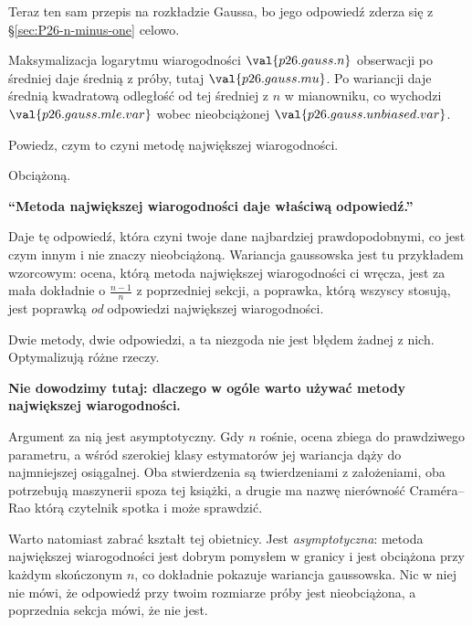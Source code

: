 \begin{fr}
Teraz ten sam przepis na rozkładzie Gaussa, bo jego odpowiedź zderza się z
\S\ref{sec:P26-n-minus-one} celowo.

Maksymalizacja logarytmu wiarogodności $\val{p26.gauss.n}$ obserwacji po
średniej daje średnią z próby, tutaj $\val{p26.gauss.mu}$. Po wariancji daje
średnią kwadratową odległość od tej średniej \dash{} z $n$ w mianowniku, co
wychodzi $\val{p26.gauss.mle.var}$ wobec nieobciążonej
$\val{p26.gauss.unbiased.var}$.

Powiedz, czym to czyni metodę największej wiarogodności.
\dotline
\nextframe
\end{fr}

\begin{fr}
\begin{ansblock}
Obciążoną.
\end{ansblock}

\begin{trapbox}
\textbf{\enquote{Metoda największej wiarogodności daje właściwą odpowiedź.}}

Daje tę odpowiedź, która czyni twoje dane najbardziej prawdopodobnymi, co
jest czym innym i nie znaczy nieobciążoną. Wariancja gaussowska jest tu
przykładem wzorcowym: ocena, którą metoda największej wiarogodności ci wręcza,
jest za mała dokładnie o $\frac{n-1}{n}$ z poprzedniej sekcji, a poprawka,
którą wszyscy stosują, jest poprawką \emph{od} odpowiedzi największej
wiarogodności.

Dwie metody, dwie odpowiedzi, a ta niezgoda nie jest błędem żadnej z nich.
Optymalizują różne rzeczy.
\end{trapbox}
\end{fr}

\begin{fr}
\begin{rigourbox}
\textbf{Nie dowodzimy tutaj: dlaczego w ogóle warto używać metody największej
wiarogodności.}

Argument za nią jest asymptotyczny. Gdy $n$ rośnie, ocena zbiega do
prawdziwego parametru, a wśród szerokiej klasy estymatorów jej wariancja
dąży do najmniejszej osiągalnej. Oba stwierdzenia są twierdzeniami z
założeniami, oba potrzebują maszynerii spoza tej książki, a drugie ma nazwę
\dash{} nierówność Craméra--Rao \dash{} którą czytelnik spotka i może
sprawdzić.

Warto natomiast zabrać kształt tej obietnicy. Jest \emph{asymptotyczna}:
metoda największej wiarogodności jest dobrym pomysłem w granicy i jest
obciążona przy każdym skończonym $n$, co dokładnie pokazuje wariancja
gaussowska. Nic w niej nie mówi, że odpowiedź przy twoim rozmiarze próby jest
nieobciążona, a poprzednia sekcja mówi, że nie jest.
\end{rigourbox}
\end{fr}

